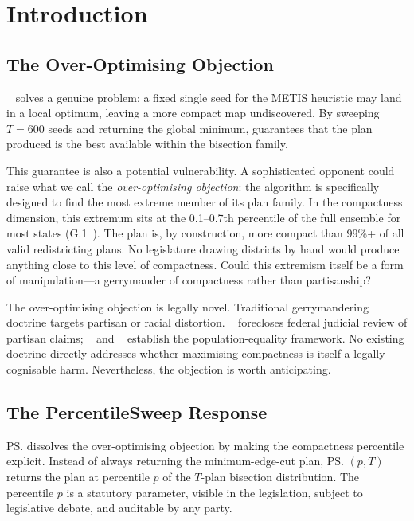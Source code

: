 \section{Introduction}
\label{sec:introduction}

\subsection{The Over-Optimising Objection}

\cs{}~\citep{b16paper} solves a genuine problem: a fixed single seed for
the METIS heuristic may land in a local optimum, leaving a more compact map
undiscovered.
By sweeping $T = 600$ seeds and returning the global minimum, \cs{}
guarantees that the plan produced is the best available within the bisection
family.

This guarantee is also a potential vulnerability.
A sophisticated opponent could raise what we call the \emph{over-optimising
objection}: the algorithm is specifically designed to find the most extreme
member of its plan family.
In the compactness dimension, this extremum sits at the 0.1--0.7th percentile
of the full \recom{} ensemble for most states (G.1~\citep{g1paper}).
The plan is, by construction, more compact than 99\%+ of all valid
redistricting plans.
No legislature drawing districts by hand would produce anything close to
this level of compactness.
Could this extremism itself be a form of manipulation---a gerrymander of
compactness rather than partisanship?

The over-optimising objection is legally novel.
Traditional gerrymandering doctrine targets partisan or racial distortion.
\rucho{}~\citep{rucho2019} forecloses federal judicial review of partisan
claims; \wesberry{}~\citep{wesberry1964} and \karcher{}~\citep{karcher1983}
establish the population-equality framework.
No existing doctrine directly addresses whether maximising compactness is
itself a legally cognisable harm.
Nevertheless, the objection is worth anticipating.

\subsection{The PercentileSweep Response}

\ps{} dissolves the over-optimising objection by making the compactness
percentile explicit.
Instead of always returning the minimum-edge-cut plan, \ps{}$(p, T)$ returns
the plan at percentile $p$ of the $T$-plan bisection distribution.
The percentile $p$ is a statutory parameter, visible in the legislation,
subject to legislative debate, and auditable by any party.

